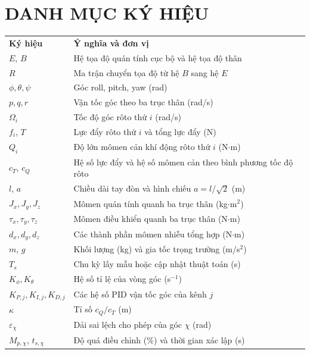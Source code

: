 \chapter*{DANH MỤC KÝ HIỆU}

\begin{tabular}{@{}L{3.5cm}L{9.8cm}@{}}
	\textbf{Ký hiệu}           & \textbf{Ý nghĩa và đơn vị}                                    \\
	$E$, $B$                   & Hệ tọa độ quán tính cục bộ và hệ tọa độ thân                  \\
	$R$                        & Ma trận chuyển tọa độ từ hệ $B$ sang hệ $E$                   \\
	$\phi,\theta,\psi$         & Góc roll, pitch, yaw (rad)                                    \\
	$p,q,r$                    & Vận tốc góc theo ba trục thân (rad/s)                         \\
	$\Omega_i$                 & Tốc độ góc rôto thứ $i$ (rad/s)                               \\
	$f_i$, $T$                 & Lực đẩy rôto thứ $i$ và tổng lực đẩy (N)                      \\
	$Q_i$                      & Độ lớn mômen cản khí động rôto thứ $i$ (N$\cdot$m)            \\
	$c_T$, $c_Q$               & Hệ số lực đẩy và hệ số mômen cản theo bình phương tốc độ rôto \\
	$l$, $a$                   & Chiều dài tay đòn và hình chiếu $a=l/\sqrt{2}$ (m)            \\
	$J_x,J_y,J_z$              & Mômen quán tính quanh ba trục thân (kg$\cdot$m$^2$)           \\
	$\tau_x,\tau_y,\tau_z$     & Mômen điều khiển quanh ba trục thân (N$\cdot$m)               \\
	$d_x,d_y,d_z$              & Các thành phần mômen nhiễu tổng hợp (N$\cdot$m)               \\
	$m$, $g$                   & Khối lượng (kg) và gia tốc trọng trường (m/s$^2$)             \\
	$T_s$                      & Chu kỳ lấy mẫu hoặc cập nhật thuật toán (s)                   \\
	$K_\phi,K_\theta$          & Hệ số tỉ lệ của vòng góc (s$^{-1}$)                           \\
	$K_{P,j},K_{I,j},K_{D,j}$  & Các hệ số PID vận tốc góc của kênh $j$                        \\
	$\kappa$                   & Tỉ số $c_Q/c_T$ (m)                                           \\
	$\varepsilon_\chi$         & Dải sai lệch cho phép của góc $\chi$ (rad)                    \\
	$M_{p,\chi}$, $t_{s,\chi}$ & Độ quá điều chỉnh (\%) và thời gian xác lập (s)               \\
\end{tabular}
